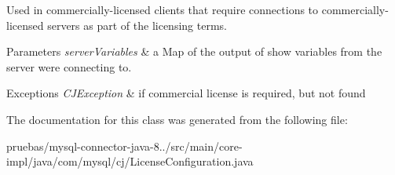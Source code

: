 Used in commercially-\/licensed clients that require connections to commercially-\/licensed servers as part of the licensing terms.


\begin{DoxyParams}{Parameters}
{\em server\+Variables} & a Map of the output of \textquotesingle{}show variables\textquotesingle{} from the server we\textquotesingle{}re connecting to.\\
\hline
\end{DoxyParams}

\begin{DoxyExceptions}{Exceptions}
{\em C\+J\+Exception} & if commercial license is required, but not found \\
\hline
\end{DoxyExceptions}


The documentation for this class was generated from the following file\+:\begin{DoxyCompactItemize}
\item 
pruebas/mysql-\/connector-\/java-\/8../src/main/core-\/impl/java/com/mysql/cj/License\+Configuration.\+java\end{DoxyCompactItemize}
